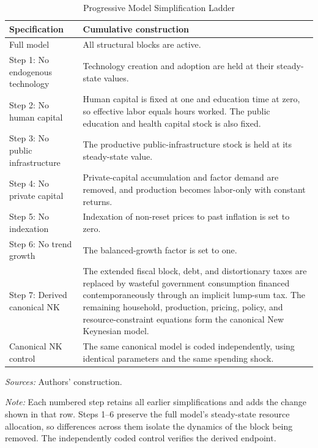 \documentclass[a4paper,11pt]{article}
\newcommand{\tabnote}[2]{\vspace{2mm}\par\noindent\begin{minipage}{0.9\textwidth}\footnotesize\setlength{\parindent}{0pt}\emph{Sources: }#1\par\vspace{2mm}\emph{Note: }#2\end{minipage}}
\begin{document}
\begin{table}[H]
    \centering
    \caption{Progressive Model Simplification Ladder \label{tab:progressiveModels}}
    \footnotesize
    \renewcommand{\arraystretch}{1.15}
    \begin{tabularx}{\textwidth}{@{}>{\raggedright\arraybackslash}p{}X@{}}
        \toprule
        Specification & Cumulative construction \\
        \midrule
        Full model & All structural blocks are active. \\
        Step 1: No endogenous technology & Technology creation and adoption are held at their steady-state values. \\
        Step 2: No human capital & Human capital is fixed at one and education time at zero, so effective labor equals hours worked. The public education and health capital stock is also fixed. \\
        Step 3: No public infrastructure & The productive public-infrastructure stock is held at its steady-state value. \\
        Step 4: No private capital & Private-capital accumulation and factor demand are removed, and production becomes labor-only with constant returns. \\
        Step 5: No indexation & Indexation of non-reset prices to past inflation is set to zero. \\
        Step 6: No trend growth & The balanced-growth factor is set to one. \\
        Step 7: Derived canonical NK & The extended fiscal block, debt, and distortionary taxes are replaced by wasteful government consumption financed contemporaneously through an implicit lump-sum tax. The remaining household, production, pricing, policy, and resource-constraint equations form the canonical New Keynesian model. \\
        Canonical NK control & The same canonical model is coded independently, using identical parameters and the same spending shock. \\
        \bottomrule
    \end{tabularx}

    \vspace{1mm}
    \tabnote{Authors' construction.}{Each numbered step retains all earlier simplifications and adds the change shown in that row.
Steps 1--6 preserve the full model's steady-state resource allocation, so differences across them isolate the dynamics of the block being removed.
The independently coded control verifies the derived endpoint.}
\end{table}
\end{document}
